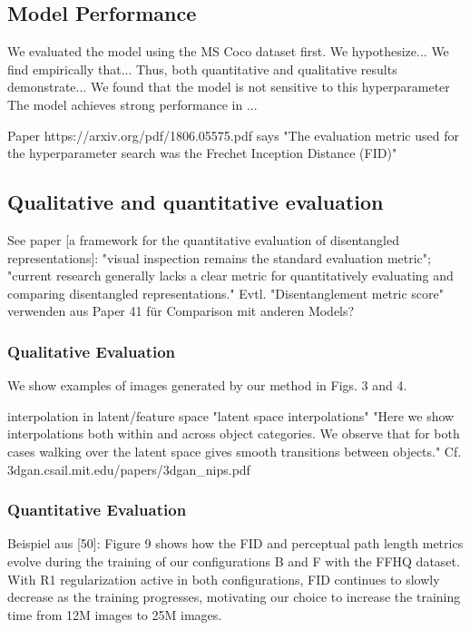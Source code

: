 \documentclass[11pt,a4paper]{article}
\begin{document}
\subsection{Model Performance}
We evaluated the model using the MS Coco dataset first.
We hypothesize...
We find empirically that...
Thus, both quantitative and qualitative results demonstrate...
We found that the model is not sensitive to this hyperparameter
The model achieves strong performance in ...

\par Paper https://arxiv.org/pdf/1806.05575.pdf says "The evaluation metric used for the hyperparameter search was the Frechet Inception Distance (FID)"

\subsection{Qualitative and quantitative evaluation}
See paper [a framework for the quantitative evaluation of disentangled representations]: "visual inspection remains the standard evaluation metric"; "current research generally lacks a clear metric for quantitatively evaluating and comparing disentangled representations."
Evtl. "Disentanglement metric score" verwenden aus Paper 41 für Comparison mit anderen Models?

\subsubsection{Qualitative Evaluation}
We show examples of images generated by our method in Figs. 3 and 4.

interpolation in latent/feature space
"latent space interpolations"
"Here we show interpolations both within and across object categories. We observe that for both cases walking over the latent space gives smooth transitions between objects." Cf. 3dgan.csail.mit.edu/papers/3dgan\_nips.pdf

\subsubsection{Quantitative Evaluation}
Beispiel aus [50]: Figure 9 shows how the FID and perceptual path length metrics evolve during the training of our configurations B and F with the FFHQ dataset. With R1 regularization active in both configurations, FID continues to slowly decrease as the training progresses, motivating our choice to increase the training time from 12M images to 25M images.
\end{document}
